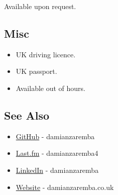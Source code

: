 Available upon request.

\subsection{Misc}\label{misc}

\begin{itemize}
\itemsep1pt\parskip0pt
\item
  UK driving licence.
\item
  UK passport.
\item
  Available out of hours.
\end{itemize}

\subsection{See Also}\label{see-also}

\begin{itemize}
\itemsep1pt\parskip0pt
\item
  \href{https://github.com/damianzaremba}{GitHub} - damianzaremba
\item
  \href{http://last.fm/user/damianzaremba4}{Last.fm} - damianzaremba4
\item
  \href{http://uk.linkedin.com/in/damianzaremba}{LinkedIn} -
  damianzaremba
\item
  \href{http://damianzaremba.co.uk}{Website} - damianzaremba.co.uk
\end{itemize}
